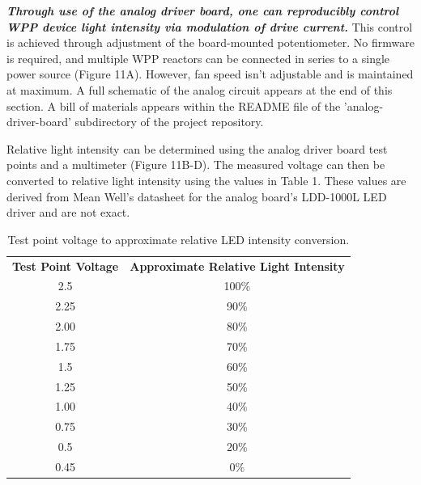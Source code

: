 \documentclass[11pt]{article}
\begin{document}
\textbf{\textit{Through use of the analog driver board, one can reproducibly control WPP device light intensity via modulation of drive current.}}
This control is achieved through adjustment of the board-mounted potentiometer.
No firmware is required, and multiple WPP reactors can be connected in series to a single power source (Figure 11A).
However, fan speed isn’t adjustable and is maintained at maximum.
A full schematic of the analog circuit appears at the end of this section.
A bill of materials appears within the README file of the 'analog-driver-board' subdirectory of the project repository.

Relative light intensity can be determined using the analog driver board test points and a multimeter (Figure 11B-D).
The measured voltage can then be converted to relative light intensity using the values in Table 1.
These values are derived from Mean Well's datasheet for the analog board’s LDD-1000L LED driver and are not exact.

\begin{table}[H]
	\centering
	\begin{tabular}{cc}
		\centering
		\textbf{Test Point Voltage} & \textbf{Approximate Relative Light Intensity} \\
		2.5                         & 100\%                                         \\
		2.25                        & 90\%                                          \\
		2.00                        & 80\%                                          \\
		1.75                        & 70\%                                          \\
		1.5                         & 60\%                                          \\
		1.25                        & 50\%                                          \\
		1.00                        & 40\%                                          \\
		0.75                        & 30\%                                          \\
		0.5                         & 20\%                                          \\
		0.45                        & 0\%
	\end{tabular}
	\caption{Test point voltage to approximate relative LED intensity conversion.}
	\label{tab:analog-board-conversion}
\end{table}
\end{document}
